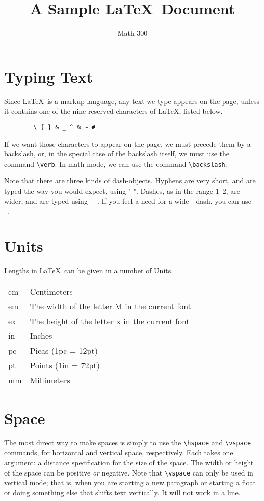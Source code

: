 \documentclass[12pt]{article}
\title{A Sample \LaTeX\ Document}
\author{Math 300}
\begin{document}
	\maketitle
	
	\section{Typing Text}
	Since \LaTeX\ is a markup language, any text we
	type appears on the page, unless it contains
	one of the nine reserved characters of \LaTeX, listed
	below.
	\begin{verbatim}
		\ { } & _ ^ % ~ #
	\end{verbatim}
	If we want those characters to appear on the page, we
	must precede them by a backslash, or, in the special
	case of the backslash itself, we must use the 
	command \verb(\verb(.  In math mode, we can use the command
	\verb(\backslash(.
	
	Note that there are three kinds of dash-objects.  Hyphens 
	are very short, and are typed the way you would expect, using
	"-".  Dashes, as in the range 1--2, are wider, and are typed
	using \verb+--+.  If you feel a need for a wide---dash, you can
	use \verb+---+.
	
	\section{Units}
	Lengths in \LaTeX\ can be given in a number of Units.\\
	\begin{tabular}{ll}
		cm & Centimeters\\
		em & The width of the letter M in the current font\\
		ex & The height of the letter x in the current font\\
		in & Inches\\
		pc & Picas (1pc = 12pt)\\
		pt & Points (1in = 72pt)\\
		mm & Millimeters
	\end{tabular}
	
	\section{Space}
	The most direct way to make spaces is simply to use the
	\verb(\hspace( and \verb(\vspace( commands, for horizontal
	and vertical space, respectively.  Each takes one
	argument: a distance specification for the size of the space.
	The width or height of the space can be positive {\em or}
	negative.  Note that \verb(\vspace( can only be used in 
	vertical mode; that is, when you are starting a new paragraph
	or starting a float or doing something else that shifts text
	vertically.  It will not work in a line.
	
\end{document}
